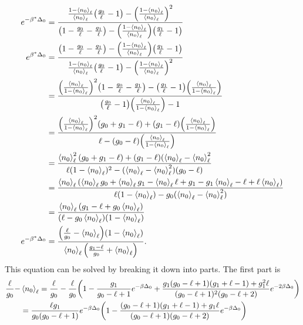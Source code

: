 \begin{align}
    e^{-\beta^*\Delta_0}&=\frac{\frac{1-\left<{n_0}\right>_\ell}{\left<{n_0}\right>_\ell}\qty(\frac{g_0}{\ell}-1)-\qty(\frac{1-\left<{n_0}\right>_\ell}{\left<{n_0}\right>_\ell})^2}{\qty(1-\frac{g_0}{\ell}-\frac{g_1}{\ell})-\qty(\frac{1-\left<{n_0}\right>_\ell}{\left<{n_0}\right>_\ell})\qty(\frac{g_1}{\ell}-1)}\\
    e^{\beta^*\Delta_0}&=\frac{\qty(1-\frac{g_0}{\ell}-\frac{g_1}{\ell})-\qty(\frac{1-\left<{n_0}\right>_\ell}{\left<{n_0}\right>_\ell})\qty(\frac{g_1}{\ell}-1)}{\frac{1-\left<{n_0}\right>_\ell}{\left<{n_0}\right>_\ell}\qty(\frac{g_0}{\ell}-1)-\qty(\frac{1-\left<{n_0}\right>_\ell}{\left<{n_0}\right>_\ell})^2}\nonumber\\
    &=\frac{\qty(\frac{\left<{n_0}\right>_\ell}{1-\left<{n_0}\right>_\ell})^2\qty(1-\frac{g_0}{\ell}-\frac{g_1}{\ell})-\qty(\frac{g_1}{\ell}-1)\qty(\frac{\left<{n_0}\right>_\ell}{1-\left<{n_0}\right>_\ell})}{\qty(\frac{g_0}{\ell}-1)\qty(\frac{\left<{n_0}\right>_\ell}{1-\left<{n_0}\right>_\ell})-1}\nonumber\\
    &=\frac{\qty(\frac{\left<{n_0}\right>_\ell}{1-\left<{n_0}\right>_\ell})^2(g_0+g_1-\ell)+(g_1-\ell)\qty(\frac{\left<{n_0}\right>_\ell}{1-\left<{n_0}\right>_\ell})}{\ell-(g_0-\ell)\qty(\frac{\left<{n_0}\right>_\ell}{1-\left<{n_0}\right>_\ell})}\nonumber\\
    &=\frac{\left<{n_0}\right>_\ell^2(g_0+g_1-\ell)+(g_1-\ell)(\left<{n_0}\right>_\ell-\left<{n_0}\right>_\ell^2}{\ell(1-\left<{n_0}\right>_\ell)^2-(\left<{n_0}\right>_\ell-\left<{n_0}\right>_\ell^2)(g_0-\ell)}\nonumber\\
    &=\frac{\left<{n_0}\right>_\ell\qty(\left<{n_0}\right>_\ell g_0+\left<{n_0}\right>_\ell g_1-\left<{n_0}\right>_\ell \ell+g_1-g_1\left<{n_0}\right>_\ell-\ell+\ell\left<{n_0}\right>_\ell)}{\ell(1-\left<{n_0}\right>_\ell)-g_0(\left<{n_0}\right>_\ell-\left<{n_0}\right>_\ell^2)}\nonumber\\
    &=\frac{\left<{n_0}\right>_\ell(g_1-\ell+g_0\left<{n_0}\right>_\ell)}{(\ell-g_0\left<{n_0}\right>_\ell)(1-\left<{n_0}\right>_\ell)}\\
    e^{-\beta^*\Delta_0}&=\frac{\qty(\frac{\ell}{g_0}-\left<{n_0}\right>_\ell)\qty(1-\left<{n_0}\right>_\ell)}{\left<{n_0}\right>_\ell\qty(\frac{g_1-\ell}{g_0}+\left<{n_0}\right>_\ell)}.
\end{align}
This equation can be solved by breaking it down into parts. The first part is  
\begin{align}
    \frac{\ell}{g_0}-&\left<{n_0}\right>_\ell=\frac{\ell}{g_0}-\frac{\ell}{g_0}\qty(1-\frac{g_1}{g_0-\ell+1}e^{-\beta\Delta_0}+\frac{g_1(g_0-\ell+1)(g_1+\ell-1)+g_1^2 \ell}{(g_0-\ell+1)^2(g_0-\ell+2)} e^{-2\beta\Delta_0})\nonumber\\
    &=\frac{\ell g_1}{g_0(g_0-\ell+1)}e^{-\beta\Delta_0}\qty(1-\frac{(g_0-\ell+1)(g_1+\ell-1)+g_1\ell}{(g_0-\ell+1)(g_0-\ell+2)}e^{-\beta\Delta_0})\nonumber
\end{align}
